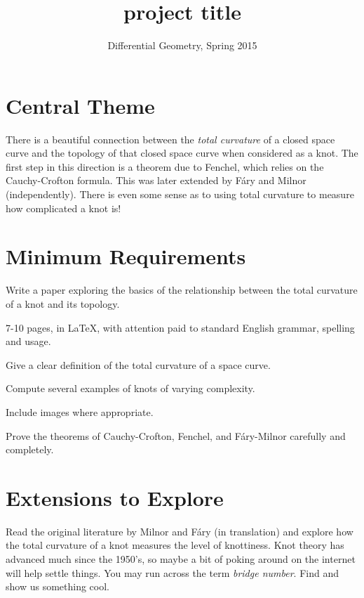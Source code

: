 \documentclass[12pt]{amsart}
\begin{document}
\title{project title}
\author{Differential Geometry, Spring 2015}

\maketitle

\section*{Central Theme}

There is a beautiful connection between the \emph{total curvature} of a closed space curve and the topology of that closed space curve when considered as a knot. The first step in this direction is a theorem due to Fenchel, which relies on the Cauchy-Crofton formula. This was later extended by F\'{a}ry and Milnor (independently). There is even some sense as to using total curvature to measure how complicated a knot is!

\section*{Minimum Requirements}

Write a paper exploring the basics of the relationship between the total curvature of a knot and its topology. 
\begin{compactitem}
\item 7-10 pages, in \LaTeX, with attention paid to standard English grammar, spelling and usage.
\item Give a clear definition of the total curvature of a space curve.
\item Compute several examples of knots of varying complexity.
\item Include images where appropriate.
\item Prove the theorems of Cauchy-Crofton, Fenchel, and F\'{a}ry-Milnor carefully and completely.
\end{compactitem}


\section*{Extensions to Explore}

Read the original literature by Milnor and F\'{a}ry (in translation) and explore how the 
total curvature of a knot measures the level of knottiness. Knot theory has advanced 
much since the 1950's, so maybe a bit of poking around on the internet will help settle 
things. You may run across the term \emph{bridge number}. Find and show us 
something cool.
\end{document}
